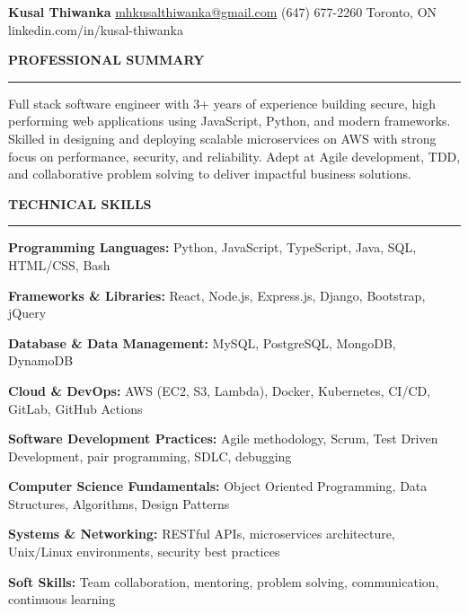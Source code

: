 \documentclass[10pt,letterpaper]{article}
\begin{document}
\begin{center}
{\large\textbf{Kusal Thiwanka}}
\href{mailto:mhkusalthiwanka@gmail.com}{mhkusalthiwanka@gmail.com}\hspace{2em}%
(647) 677{-}2260\hspace{2em}%
Toronto, ON\hspace{2em}
linkedin.com/in/kusal-thiwanka
\end{center}

\vspace{6pt}

\textbf{PROFESSIONAL SUMMARY}\\[-8pt]
\noindent\rule{\textwidth}{0.1pt}

\vspace{1pt}

Full stack software engineer with 3+ years of experience building secure, high performing web applications using JavaScript, Python, and modern frameworks. Skilled in designing and deploying scalable microservices on AWS with strong focus on performance, security, and reliability. Adept at Agile development, TDD, and collaborative problem solving to deliver impactful business solutions.

\vspace{3pt}

\textbf{TECHNICAL SKILLS}\\[-8pt]
\noindent\rule{\textwidth}{0.1pt}

\vspace{1pt}

\textbf{Programming Languages:} Python, JavaScript, TypeScript, Java, SQL, HTML/CSS, Bash

\textbf{Frameworks \& Libraries:} React, Node.js, Express.js, Django, Bootstrap, jQuery

\textbf{Database \& Data Management:} MySQL, PostgreSQL, MongoDB, DynamoDB

\textbf{Cloud \& DevOps:} AWS (EC2, S3, Lambda), Docker, Kubernetes, CI/CD, GitLab, GitHub Actions

\textbf{Software Development Practices:} Agile methodology, Scrum, Test Driven Development, pair programming, SDLC, debugging

\textbf{Computer Science Fundamentals:} Object Oriented Programming, Data Structures, Algorithms, Design Patterns

\textbf{Systems \& Networking:} RESTful APIs, microservices architecture, Unix/Linux environments, security best practices

\textbf{Soft Skills:} Team collaboration, mentoring, problem solving, communication, continuous learning
\end{document}
